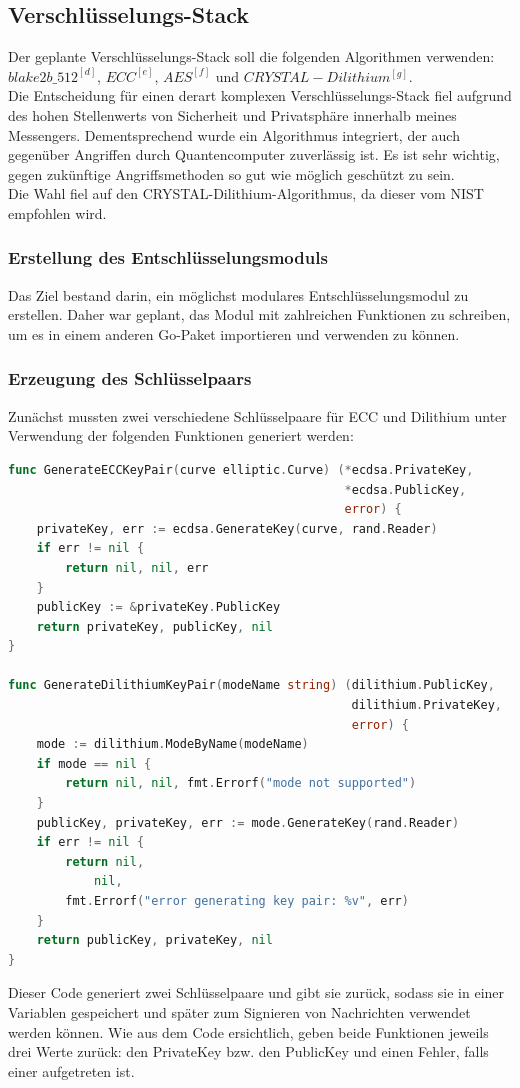 \subsection{Verschlüsselungs-Stack}
Der geplante Verschlüsselungs-Stack soll die folgenden Algorithmen verwenden: \hyperref[glo:blake]{\(blake2b\_512^{[d]}\)}, \hyperref[glo:ecc]{\(ECC^{[e]}\)}, \hyperref[glo:aes]{\(AES^{[f]}\)} und \hyperref[glo:crystal-dilithium]{\(CRYSTAL-Dilithium^{[g]}\)}.
\\
Die Entscheidung für einen derart komplexen Verschlüsselungs-Stack fiel aufgrund des hohen Stellenwerts von Sicherheit und Privatsphäre innerhalb meines Messengers. Dementsprechend wurde ein Algorithmus integriert, der auch gegenüber Angriffen durch Quantencomputer zuverlässig ist. Es ist sehr wichtig, gegen zukünftige Angriffsmethoden so gut wie möglich geschützt zu sein.
\\
Die Wahl fiel auf den CRYSTAL-Dilithium-Algorithmus, da dieser vom NIST empfohlen wird. \cite{nist-recomedation}
\subsubsection{Erstellung des Entschlüsselungsmoduls}
Das Ziel bestand darin, ein möglichst modulares Entschlüsselungsmodul zu erstellen. Daher war geplant, das Modul mit zahlreichen Funktionen zu schreiben, um es in einem anderen Go-Paket importieren und verwenden zu können.
\subsubsection{Erzeugung des Schlüsselpaars}
Zunächst mussten zwei verschiedene Schlüsselpaare für ECC und Dilithium unter Verwendung der folgenden Funktionen generiert werden:
\begin{lstlisting}[language=Go]
func GenerateECCKeyPair(curve elliptic.Curve) (*ecdsa.PrivateKey,
                                               *ecdsa.PublicKey,
                                               error) {
    privateKey, err := ecdsa.GenerateKey(curve, rand.Reader)
    if err != nil {
        return nil, nil, err
    }
    publicKey := &privateKey.PublicKey
    return privateKey, publicKey, nil
}

func GenerateDilithiumKeyPair(modeName string) (dilithium.PublicKey,
                                                dilithium.PrivateKey,
                                                error) {
    mode := dilithium.ModeByName(modeName)
    if mode == nil {
        return nil, nil, fmt.Errorf("mode not supported")
    }
    publicKey, privateKey, err := mode.GenerateKey(rand.Reader)
    if err != nil {
        return nil,
            nil,
        fmt.Errorf("error generating key pair: %v", err)
    }
    return publicKey, privateKey, nil
}
\end{lstlisting}
Dieser Code generiert zwei Schlüsselpaare und gibt sie zurück, sodass sie in einer Variablen gespeichert und später zum Signieren von Nachrichten verwendet werden können. Wie aus dem Code ersichtlich, geben beide Funktionen jeweils drei Werte zurück: den PrivateKey bzw. den PublicKey und einen Fehler, falls einer aufgetreten ist.
